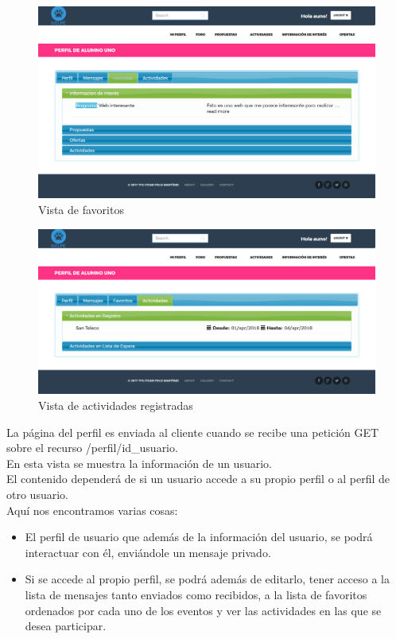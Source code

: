 \begin{figure}[H]
\centering
\includegraphics[width=12cm]{img/perfil_favoritos}
\caption{Vista de favoritos}
\label{figura:perfil_favoritos}
\end{figure}
\begin{figure}[H]
\centering
\includegraphics[width=12cm]{img/perfil_actividades}
\caption{Vista de actividades registradas}
\label{figura:perfil_actividades}
\end{figure}
La página del perfil es enviada al cliente cuando se recibe una petición GET sobre el recurso /perfil/{id\_usuario}.\\
En esta vista se muestra la información de un usuario.\\
El contenido dependerá de si un usuario accede a su propio perfil o al perfil de otro usuario.\\
Aquí nos encontramos varias cosas:
\begin{itemize}
\item El perfil de usuario que además de la información del usuario, se podrá interactuar con él, enviándole un mensaje privado.
\item Si se accede al propio perfil, se podrá además de editarlo, tener acceso a la lista de mensajes tanto enviados como recibidos, a la lista de favoritos ordenados por cada uno de los eventos y ver las actividades en las que se desea participar.
\end{itemize} 

